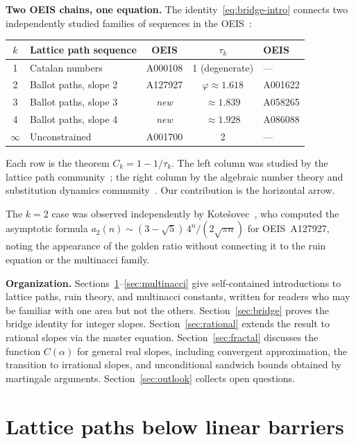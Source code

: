 \documentclass[11pt]{article}
\theoremstyle{definition}
\theoremstyle{remark}
\begin{document}
\medskip\noindent\textbf{Two OEIS chains, one equation.}
The identity~\eqref{eq:bridge-intro} connects two independently studied
families of sequences in the OEIS~\cite{oeis}:
\begin{center}
\begin{tabular}{clccl}
\toprule
$k$ & Lattice path sequence & OEIS & $\tau_k$ & OEIS \\
\midrule
1 & Catalan numbers & A000108 & 1 (degenerate) & --- \\
2 & Ballot paths, slope 2 & A127927 & $\varphi \approx 1.618$ & A001622 \\
3 & Ballot paths, slope 3 & \emph{new} & $\approx 1.839$ & A058265 \\
4 & Ballot paths, slope 4 & \emph{new} & $\approx 1.928$ & A086088 \\
$\infty$ & Unconstrained & A001700 & 2 & --- \\
\bottomrule
\end{tabular}
\end{center}
Each row is the theorem $C_k = 1 - 1/\tau_k$.
The left column was studied by the lattice path
community~\cite{BanderierFlajolet2002, BanderierWallner2016,
Krattenthaler2015}; the right column by the algebraic
number theory and substitution dynamics
community~\cite{Miles1960, Rauzy1982, DresdenDu2014}.
Our contribution is the horizontal arrow.

The $k = 2$ case was observed independently by
Kote\v{s}ovec~\cite{Kotesovec2012}, who computed the asymptotic
formula $a_2(n) \sim (3 - \sqrt{5})\, 4^n / (2\sqrt{\pi n})$ for
OEIS~A127927, noting the appearance of the golden ratio without
connecting it to the ruin equation or the multinacci family.

\medskip\noindent\textbf{Organization.}
Sections~\ref{sec:lattice}--\ref{sec:multinacci} give self-contained
introductions to lattice paths, ruin theory, and multinacci constants,
written for readers who may be familiar with one area but not the
others.
Section~\ref{sec:bridge} proves the bridge identity for integer slopes.
Section~\ref{sec:rational} extends the result to rational slopes via
the master equation.
Section~\ref{sec:fractal} discusses the function $C(\alpha)$ for
general real slopes, including convergent approximation, the
transition to irrational slopes, and unconditional sandwich bounds
obtained by martingale arguments.
Section~\ref{sec:outlook} collects open questions.

\section{Lattice paths below linear barriers}\label{sec:lattice}
\end{document}
